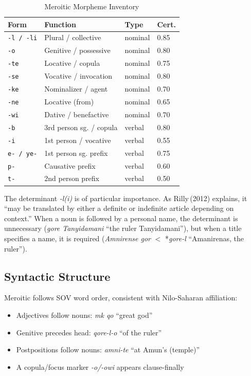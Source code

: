 \documentclass[11pt,a4paper]{article}
\begin{document}
\begin{table}[htbp]
\centering
\caption{Meroitic Morpheme Inventory}
\label{tab:morph}
\begin{tabular}{llll}
  \toprule
  \textbf{Form} & \textbf{Function} & \textbf{Type} & \textbf{Cert.} \\
  \midrule
    \texttt{-l / -li} & Plural / collective & nominal & 0.85 \\
    \texttt{-o} & Genitive / possessive & nominal & 0.80 \\
    \texttt{-te} & Locative / copula & nominal & 0.75 \\
    \texttt{-se} & Vocative / invocation & nominal & 0.80 \\
    \texttt{-ke} & Nominalizer / agent & nominal & 0.70 \\
    \texttt{-ne} & Locative (from) & nominal & 0.65 \\
    \texttt{-wi} & Dative / benefactive & nominal & 0.70 \\
    \texttt{-b} & 3rd person sg. / copula & verbal & 0.80 \\
    \texttt{-i} & 1st person / vocative & verbal & 0.55 \\
    \texttt{e- / ye-} & 1st person sg. prefix & verbal & 0.75 \\
    \texttt{p-} & Causative prefix & verbal & 0.60 \\
    \texttt{t-} & 2nd person prefix & verbal & 0.50 \\
  \bottomrule
\end{tabular}
\end{table}

The determinant \textit{-l(i)} is of particular importance. As Rilly\,(2012)
explains, it ``may be translated by either a definite or indefinite article
depending on context.'' When a noun is followed by a personal name, the
determinant is unnecessary (\textit{gore Tanyidamani} ``the ruler Tanyidamani''),
but when a title specifies a name, it is required (\textit{Amnirense gor}
$<$ *\textit{gore-l} ``Amanirenas, the ruler'').

\subsection{Syntactic Structure}

Meroitic follows SOV word order, consistent with Nilo-Saharan affiliation:
\begin{itemize}[nosep]
  \item Adjectives follow nouns: \textit{mk qo} ``great god''
  \item Genitive precedes head: \textit{qore-l-o} ``of the ruler''
  \item Postpositions follow nouns: \textit{amni-te} ``at Amun's (temple)''
  \item A copula/focus marker \textit{-o/-owi} appears clause-finally
\end{itemize}
\end{document}
